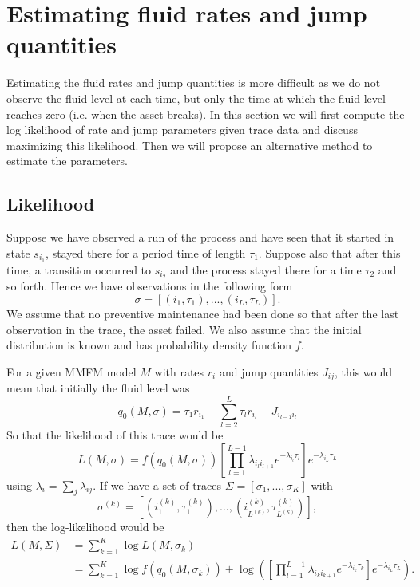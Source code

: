 \documentclass[a4paper]{thesis}
\theoremstyle{definition}
\begin{document}
\section{Estimating fluid rates and jump quantities}
Estimating the fluid rates and jump quantities is more difficult as we do not observe the fluid level at each time, but only the time at which the fluid level reaches zero (i.e. when the asset breaks).
In this section we will first compute the log likelihood of rate and jump parameters given trace data and discuss maximizing this likelihood.
Then we will propose an alternative method to estimate the parameters.

\subsection{Likelihood}
Suppose we have observed a run of the process and have seen that it started in state $s_{i_1}$, stayed there for a period time of length $\tau_1$.
Suppose also that after this time, a transition occurred to $s_{i_2}$ and the process stayed there for a time $\tau_2$ and so forth.
Hence we have observations in the following form
$$
\sigma=\left[(i_1,\tau_1),...,(i_L,\tau_L)\right].
$$
We assume that no preventive maintenance had been done so that after the last observation in the trace, the asset failed.
We also assume that the initial distribution is known and has probability density function $f$.

For a given MMFM model $M$ with rates $r_i$ and jump quantities $J_{ij}$, this would mean that initially the fluid level was
\begin{equation}\label{eq:initialLevelDefinition}
q_0(M,\sigma)=\tau_1r_{i_1}+\sum\limits_{l=2}^{L}\tau_lr_{i_l}-J_{i_{l-1}i_l}
\end{equation}
So that the likelihood of this trace would be
$$
L(M,\sigma)=f(q_0(M,\sigma))\left[\prod\limits_{l=1}^{L-1}\lambda_{i_li_{l+1}}e^{-\lambda_{i_l}\tau_l}\right]e^{-\lambda_{i_L}\tau_L}
$$
using $\lambda_i=\sum_j\lambda_{ij}$.
If we have a set of traces $\Sigma=[\sigma_1,...,\sigma_K]$ with \[
\sigma^{(k)}=\left[(i_1^{(k)},\tau_1^{(k)}),...,(i_{L^{(k)}}^{(k)},\tau_{L^{(k)}}^{(k)})\right],
\]
then the log-likelihood would be
\begin{equation}\label{eq:MmfmLikelihood}
\begin{split}
L(M,\Sigma)&=\sum\limits_{k=1}^K\log L(M,\sigma_k)\\
&=\sum\limits_{k=1}^K\log f(q_0(M,\sigma_k))+\log\left(\left[\prod\limits_{l=1}^{L-1}\lambda_{i_ki_{k+1}}e^{-\lambda_{i_k}\tau_k}\right]e^{-\lambda_{i_L}\tau_L}\right).
\end{split}
\end{equation}
\end{document}
